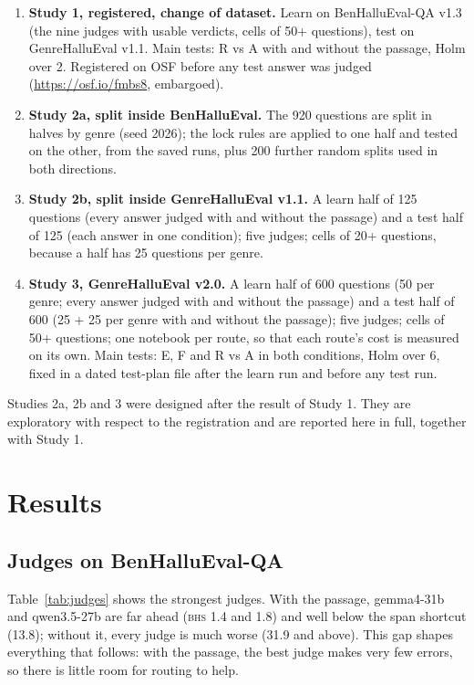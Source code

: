 \documentclass[pdflatex,sn-apa]{sn-jnl}
\newcommand{\BHS}{\textsc{bhs}}
\begin{document}
\begin{enumerate}
  \item \textbf{Study 1, registered, change of dataset.} Learn on BenHalluEval-QA v1.3 (the nine judges with usable
  verdicts, cells of 50+ questions), test on GenreHalluEval v1.1. Main tests: R vs A with and without the passage, Holm over 2. Registered
  on OSF before any test answer was judged (\url{https://osf.io/fmbs8}, embargoed).
  \item \textbf{Study 2a, split inside BenHalluEval.} The 920 questions are split in halves by genre (seed 2026); the
  lock rules are applied to one half and tested on the other, from the saved runs, plus 200 further random splits
  used in both directions.
  \item \textbf{Study 2b, split inside GenreHalluEval v1.1.} A learn half of 125 questions (every answer judged with
  and without the passage) and a test half of 125 (each answer in one condition); five judges; cells of 20+ questions,
  because a half has 25 questions per genre.
  \item \textbf{Study 3, GenreHalluEval v2.0.} A learn half of 600 questions (50 per genre; every answer judged with and
  without the passage) and a test half of 600 (25 + 25 per genre with and without the passage); five judges; cells of
  50+ questions; one notebook per route, so that each route's cost is measured on its own. Main tests: E, F and R vs A
  in both conditions, Holm over 6, fixed in a dated test-plan file after the learn run and before any test run.
\end{enumerate}
Studies 2a, 2b and 3 were designed after the result of Study 1. They are exploratory with respect to the registration
and are reported here in full, together with Study 1.

\section{Results}\label{sec:results}

\subsection{Judges on BenHalluEval-QA}

Table~\ref{tab:judges} shows the strongest judges. With the passage, gemma4-31b and qwen3.5-27b are far ahead
(\BHS{} 1.4 and 1.8) and well below the span shortcut (13.8); without it, every judge is much worse (31.9 and above).
This gap shapes everything that follows: with the passage, the best judge makes very few errors, so there is little
room for routing to help.
\end{document}
